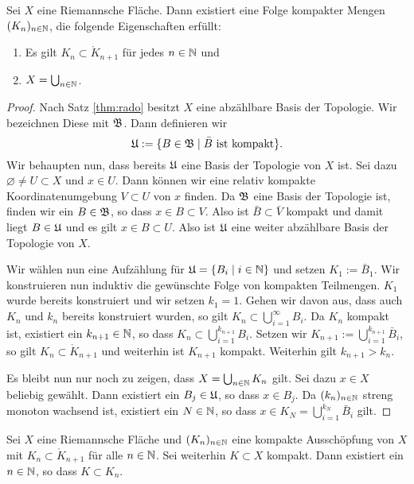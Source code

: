 \begin{thm}
  \label{thm:kompakte-ausschöpfung}
  Sei $X$ eine Riemannsche Fläche. Dann existiert eine Folge kompakter Mengen
  $(K_n)_{n \in \mathbb{N}}$, die folgende Eigenschaften erfüllt:
  \begin{enumerate}
  \item Es gilt $K_n \subset \mathring K_{n+1}$ für jedes $n \in \mathbb{N}$ und
  \item $X = \bigcup_{n \in \mathbb{N}}$.
  \end{enumerate}
\end{thm}

\begin{proof}
  Nach Satz \ref{thm:rado} besitzt $X$ eine abzählbare Basis der
  Topologie. Wir bezeichnen Diese mit $\mathfrak{B}$. Dann definieren wir
  \[
  \mathfrak{U} := \{ B \in \mathfrak{B} \mid \bar B \text{ ist kompakt}\}.
  \]
  Wir behaupten nun, dass bereits $\mathfrak{U}$ eine Basis der Topologie von
  $X$ ist. Sei dazu $\varnothing \neq U \subset X$ und $x \in U$. Dann
  können wir eine relativ kompakte Koordinatenumgebung $V \subset U$
  von $x$ finden. Da $\mathfrak{B}$ eine Basis der Topologie ist, finden wir
  ein $B \in \mathfrak{B}$, so dass $x \in B \subset V$. Also ist $\bar B
  \subset \bar V$ kompakt und damit liegt $B \in \mathfrak{U}$ und es gilt $x
  \in B \subset U$. Also ist $\mathfrak{U}$ eine weiter abzählbare Basis der
  Topologie von $X$.

  Wir wählen nun eine Aufzählung für $\mathfrak{U} = \{B_i \mid i \in \mathbb{N}\}$ und
  setzen $K_1 := \bar B_1$. Wir konstruieren nun induktiv die
  gewünschte Folge von kompakten Teilmengen. $K_1$ wurde bereits
  konstruiert und wir setzen $k_1 = 1$. Gehen wir davon aus, dass auch
  $K_n$ und $k_n$ bereits
  konstruiert wurden, so gilt $K_n \subset \bigcup_{i=1}^\infty
  B_i$. Da $K_n$ kompakt ist, existiert ein $k_{n+1} \in \mathbb{N}$, so dass $K_n
  \subset \bigcup_{i=1}^{k_{n+1}} B_i$. Setzen wir $K_{n+1} :=
  \bigcup_{i=1}^{k_{n+1}}\bar B_i$, so gilt $K_n \subset \mathring
  K_{n+1}$ und weiterhin ist $K_{n+1}$ kompakt. Weiterhin gilt
  $k_{n+1} > k_n$.

  Es bleibt nun nur noch zu zeigen, dass $X = \bigcup_{n \in \mathbb{N}} K_n$
  gilt. Sei dazu $x \in X$ beliebig gewählt. Dann existiert ein $B_j \in
  \mathfrak{U}$, so dass $x \in B_j$. Da $(k_n)_{n \in\mathbb{N}}$ streng monoton
  wachsend ist, existiert ein $N \in \mathbb{N}$, so dass $x \in K_N =
  \bigcup_{i=1}^{k_N} \bar B_i$ gilt.
\end{proof}

\begin{lemma}
  \label{lemma:kompakt-in-ausschöpfung}
  Sei $X$ eine Riemannsche Fläche und $(K_n)_{n \in \mathbb{N}}$ eine kompakte
  Ausschöpfung von $X$ mit $K_n \subset \mathring K_{n+1}$ für alle $n
  \in \mathbb{N}$. Sei weiterhin $K \subset X$ kompakt. Dann existiert ein $n
  \in \mathbb{N}$, so dass $K \subset K_n$.
\end{lemma}


